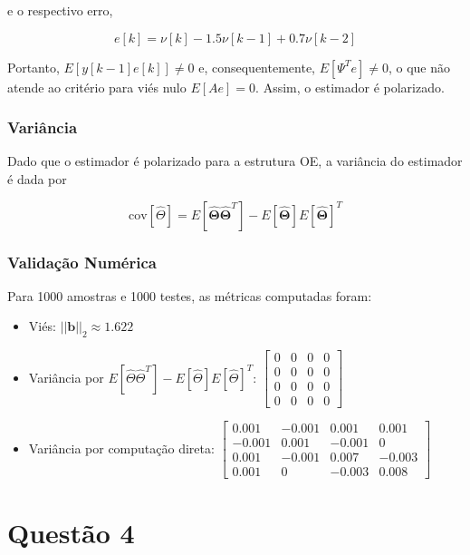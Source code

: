 \documentclass{article}
\begin{document}
e o respectivo erro,

\begin{equation*}
e[k] = \nu[k] - 1.5\nu[k - 1] + 0.7\nu[k - 2]
\end{equation*}

Portanto, $E[y[k - 1]e[k]] \neq 0$ e, consequentemente, $E[\Psi^Te] \neq 0$, o que não atende ao critério para viés nulo $E[Ae] = 0$. Assim, o estimador é polarizado.

\subsubsection*{Variância}

Dado que o estimador é polarizado para a estrutura OE, a variância do estimador é dada por

\begin{equation*}
\text{cov}[\hat{\Theta}] = E[\boldsymbol{\hat{\Theta}}\boldsymbol{\hat{\Theta}}^T] - E[\boldsymbol{\hat{\Theta}}]E[\boldsymbol{\hat{\Theta}}]^T
\end{equation*}

\subsubsection*{Validação Numérica}

Para 1000 amostras e 1000 testes, as métricas computadas foram:

\begin{itemize}
    \item Viés: $||\boldsymbol{b}||_2 \approx 1.622$
    \item Variância por $E[\hat{\Theta}\hat{\Theta}^T] - E[\hat{\Theta}]E[\hat{\Theta}]^T$: $\begin{bmatrix} 0 & 0 & 0 & 0 \\ 0 & 0 & 0 & 0 \\ 0 & 0 & 0 & 0 \\ 0 & 0 & 0 & 0 \end{bmatrix}$
    \item Variância por computação direta: $\begin{bmatrix} 0.001 & -0.001 & 0.001 & 0.001 \\ -0.001 & 0.001 & -0.001 & 0 \\ 0.001 & -0.001 & 0.007 & -0.003 \\ 0.001 & 0 & -0.003 & 0.008 \end{bmatrix}$
\end{itemize}

\section*{Questão 4}
\end{document}
